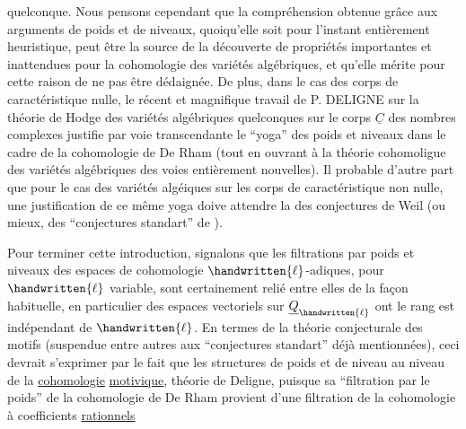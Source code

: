 quelconque.  Nous pensons cependant\deleted{,} que la compréhension obtenue grâce aux arguments de poids et de niveaux, quoiqu'elle soit pour l'instant entièrement heuristique,  peut être la source de la découverte de propriétés importantes et inattendues pour la cohomologie des variétés algébriques,  et qu'elle mérite pour cette raison de ne pas être dédaignée. De plus, dans le cas des corps de caractéristique nulle,  le récent et magnifique travail de P. DELIGNE sur la théorie de Hodge des variétés algébriques quelconques sur le corps $\underline{C}$ des nombres complexes\deleted{,} justifie par voie transcendante le ``yoga'' des poids et niveaux dans le cadre de la cohomologie de De Rham\handwritten{,} (tout en ouvrant à la théorie cohomoligue des variétés algébriques des voies entièrement nouvelles). Il  probable d'autre part que pour le cas des  variétés algéiques sur les corps de caractéristique non nulle, une justification de ce même yoga doive attendre la  des conjectures de Weil (ou mieux, des ``conjectures standart'' de \handwritten{[\quad]}).

Pour  terminer cette introduction, signalons que les filtrations par poids et niveaux des espaces de cohomologie $\handwritten{\ell}$-adiques, pour $\handwritten{\ell}$ variable, sont certainement relié entre elles de la façon habituelle,  en particulier des espaces vectoriels sur $\underline{Q}_{\handwritten{\ell}}$ ont le  rang est indépendant de $\handwritten{\ell}$. En termes de la théorie conjecturale des motifs (suspendue entre autres aux ``conjectures standart'' déjà mentionnées), ceci devrait s'exprimer par le fait que les structures de poids et de niveau au niveau de la \uline{cohomologie}  \uline{motivique},  théorie de Deligne,  puisque sa ``filtration par le poids'' de la cohomologie de De Rham provient d'une filtration de la cohomologie à coefficients \uline{rationnels}

